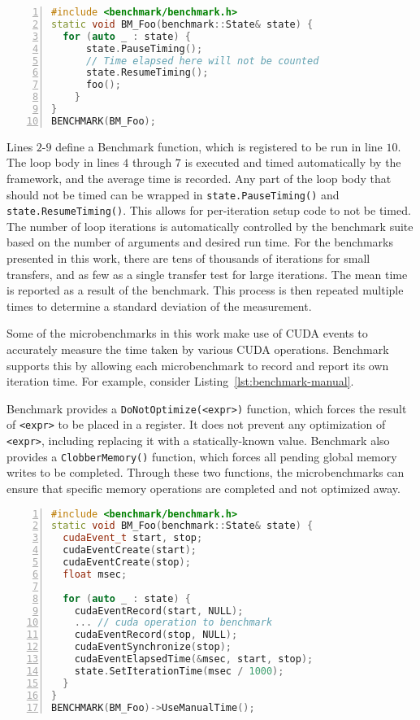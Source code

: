 \begin{minipage}{\linewidth}
\begin{lstlisting}[language=C++, caption=Benchmark with automatic timing., label=lst:benchmark-automatic, numbers=left]
#include <benchmark/benchmark.h>
static void BM_Foo(benchmark::State& state) {
  for (auto _ : state) {
	  state.PauseTiming();
	  // Time elapsed here will not be counted
	  state.ResumeTiming();
	  foo();
	}
}
BENCHMARK(BM_Foo);
\end{lstlisting}
\end{minipage}

Lines $2$-$9$ define a Benchmark function, which is registered to be run in line $10$.
The loop body in lines $4$ through $7$ is executed and timed automatically by the framework, and the average time is recorded.
Any part of the loop body that should not be timed can be wrapped in \texttt{state.PauseTiming()} and \texttt{state.ResumeTiming()}.
This allows for per-iteration setup code to not be timed.
The number of loop iterations is automatically controlled by the benchmark suite based on the number of arguments and desired run time.
For the benchmarks presented in this work, there are tens of thousands of iterations for small transfers, and as few as a single transfer test for large iterations.
The mean time is reported as a result of the benchmark.
This process is then repeated multiple times to determine a standard deviation of the measurement.

Some of the microbenchmarks in this work make use of CUDA events to accurately measure the time taken by various CUDA operations.
Benchmark supports this by allowing each microbenchmark to record and report its own iteration time.
For example, consider Listing~\ref{lst:benchmark-manual}.

Benchmark provides a \texttt{DoNotOptimize(<expr>)} function, which forces the result of \texttt{<expr>} to be placed in a register.
It does not prevent any optimization of \texttt{<expr>}, including replacing it with a statically-known value.
Benchmark also provides a \texttt{ClobberMemory()} function, which forces all pending global memory writes to be completed.
Through these two functions, the microbenchmarks can ensure that specific memory operations are completed and not optimized away.

\begin{minipage}{\linewidth}
\begin{lstlisting}[language=C++, caption=Benchmark with manual timing., label=lst:benchmark-manual, numbers=left]
#include <benchmark/benchmark.h>
static void BM_Foo(benchmark::State& state) {
  cudaEvent_t start, stop;
  cudaEventCreate(start);
  cudaEventCreate(stop);
  float msec;

  for (auto _ : state) {
    cudaEventRecord(start, NULL);
    ... // cuda operation to benchmark
    cudaEventRecord(stop, NULL);
    cudaEventSynchronize(stop);
    cudaEventElapsedTime(&msec, start, stop);
    state.SetIterationTime(msec / 1000);
  }
}
BENCHMARK(BM_Foo)->UseManualTime();
\end{lstlisting}
\end{minipage}

